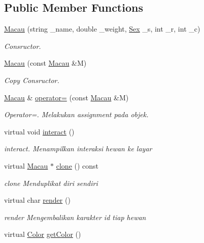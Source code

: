 \subsection*{Public Member Functions}
\begin{DoxyCompactItemize}
\item 
\hyperlink{classMacau_afb26f421e039ad900f086f1110ceb1d5}{Macau} (string \+\_\+name, double \+\_\+weight, \hyperlink{sex_8h_a2633cb393c68bb2ee8080db58fb7ba93}{Sex} \+\_\+s, int \+\_\+r, int \+\_\+c)
\begin{DoxyCompactList}\small\item\em Consructor. \end{DoxyCompactList}\item 
\hyperlink{classMacau_ae6972723c5aa607606d00b7b8ade4b85}{Macau} (const \hyperlink{classMacau}{Macau} \&M)
\begin{DoxyCompactList}\small\item\em Copy Consructor. \end{DoxyCompactList}\item 
\hyperlink{classMacau}{Macau} \& \hyperlink{classMacau_a6fde24d6bbdb7afa98f2ed7ed7eca92d}{operator=} (const \hyperlink{classMacau}{Macau} \&M)
\begin{DoxyCompactList}\small\item\em Operator=. Melakukan assignment pada objek. \end{DoxyCompactList}\item 
virtual void \hyperlink{classMacau_aeea725c520e0ae63e9565111df511f99}{interact} ()
\begin{DoxyCompactList}\small\item\em interact. Menampilkan interaksi hewan ke layar \end{DoxyCompactList}\item 
virtual \hyperlink{classMacau}{Macau} $\ast$ \hyperlink{classMacau_a66cffd38f3eeb221344a52b62591a06e}{clone} () const 
\begin{DoxyCompactList}\small\item\em clone Menduplikat diri sendiri \end{DoxyCompactList}\item 
virtual char \hyperlink{classMacau_a602bb3398d2a6fbdf9cd918b7c472ab2}{render} ()
\begin{DoxyCompactList}\small\item\em render Mengembalikan karakter id tiap hewan \end{DoxyCompactList}\item 
virtual \hyperlink{color_8h_ab87bacfdad76e61b9412d7124be44c1c}{Color} \hyperlink{classMacau_a1461b6b1bb3b72026cbf6e27b2053f89}{get\+Color} ()

\end{DoxyCompactItemize}
